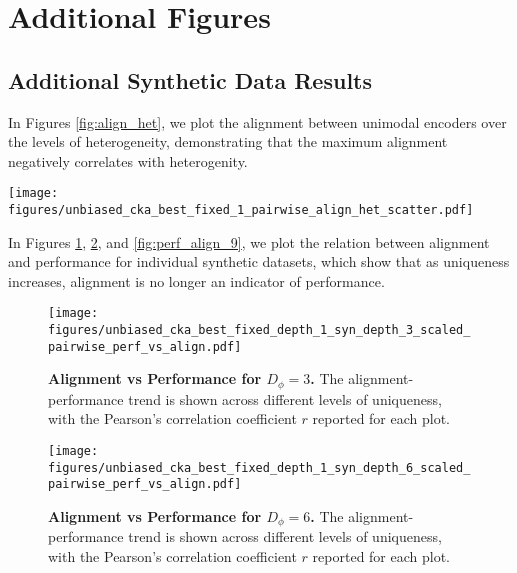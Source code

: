 \section{Additional Figures}

\subsection{Additional Synthetic Data Results}\label{app:synthetic_align}


In Figures \ref{fig:align_het}, we plot the alignment between unimodal encoders over the levels of heterogeneity, demonstrating that the maximum alignment negatively correlates with heterogenity. 

\begin{figure*}[t!]
    \centering
    \texttt{[image: figures/unbiased\_cka\_best\_fixed\_1\_pairwise\_align\_het\_scatter.pdf]}
    \caption{\textbf{Alignment vs. Heterogeneity.} The alignment is computed between unimodal encoders trained on datasets with different levels of heterogeneity. Each dot is an independent run on a different model size on a given dataset. We compute the Pearson correlation coefficient $r$ between heterogeneity and maximum alignment, and see that the maximum level of achievable level of alignment decreases as the level of uniqueness increases. 5 different figures shows 5 levels of informational uniqueness.}
    \label{fig:align_het}
\end{figure*}

In Figures \ref{fig:perf_align_3}, \ref{fig:perf_align_6}, and \ref{fig:perf_align_9}, we plot the relation between alignment and performance for individual synthetic datasets, which show that as uniqueness increases, alignment is no longer an indicator of performance. 



\begin{figure}[t!]
    \centering
    \texttt{[image: figures/unbiased\_cka\_best\_fixed\_depth\_1\_syn\_depth\_3\_scaled\_pairwise\_perf\_vs\_align.pdf]}
    \caption{\textbf{Alignment vs Performance for $D_{\phi}=3$.} The alignment-performance trend is shown across different levels of uniqueness, with the Pearson's correlation coefficient $r$ reported for each plot.  }
    \label{fig:perf_align_3}
\end{figure}

\begin{figure}[t!]
    \centering
    \texttt{[image: figures/unbiased\_cka\_best\_fixed\_depth\_1\_syn\_depth\_6\_scaled\_pairwise\_perf\_vs\_align.pdf]}
    \caption{\textbf{Alignment vs Performance for $D_{\phi}=6$.} The alignment-performance trend is shown across different levels of uniqueness, with the Pearson's correlation coefficient $r$ reported for each plot. }
    \label{fig:perf_align_6}
\end{figure}

